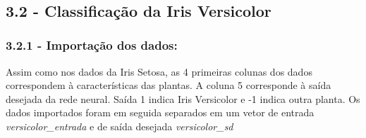 \documentclass[11pt]{article}
\begin{document}
    \begin{center}
    \end{center}
    { \hspace*{\fill} \\}
    
    \subsection{3.2 - Classificação da Iris
Versicolor}\label{classificauxe7uxe3o-da-iris-versicolor}

\subsubsection{3.2.1 - Importação dos
dados:}\label{importauxe7uxe3o-dos-dados}

Assim como nos dados da Iris Setosa, as 4 primeiras colunas dos dados
correspondem à características das plantas. A coluna 5 corresponde à
saída desejada da rede neural. Saída 1 indica Iris Versicolor e -1
indica outra planta. Os dados importados foram em seguida separados em
um vetor de entrada \emph{versicolor\_entrada} e de saída desejada
\emph{versicolor\_sd}
\end{document}
